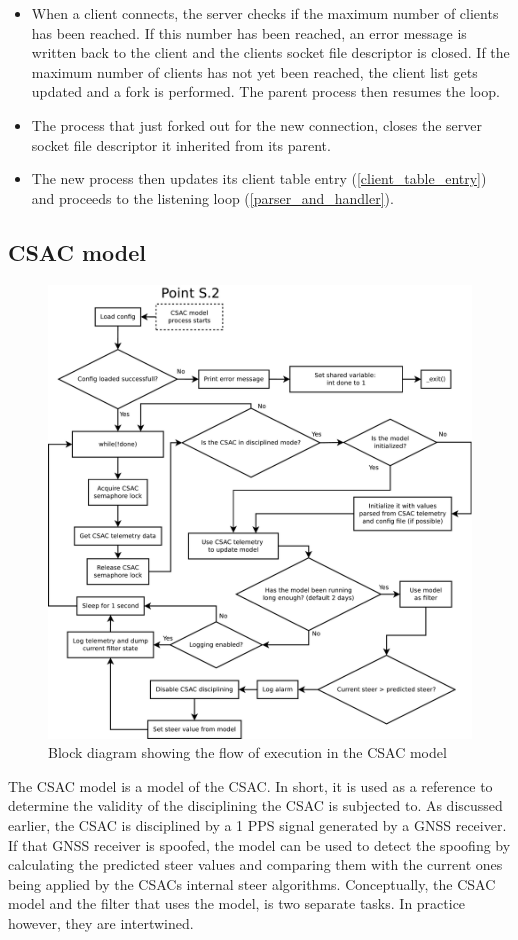 \documentclass[12pt,english,a4paper]{report}
\begin{document}
\begin{itemize}
  \item When a client connects, the server checks if the maximum number of clients has been reached. If this number has been reached, an error message is written back to the client and the clients socket file descriptor is closed. If the maximum number of clients has not yet been reached, the client list gets updated and a fork is performed.
  The parent process then resumes the loop. 
  \item The process that just forked out for the new connection, closes the server socket file descriptor it inherited from its parent. 
  \item The new process then updates its client table entry (\ref{client_table_entry}) and proceeds to the listening loop (\ref{parser_and_handler}).
\end{itemize}

\subsection{CSAC model}
\begin{figure}
\centering
  \includegraphics[scale=0.30]{csac_filter_model.pdf}
   \caption[CSAC model execution flow block diagram]{Block diagram showing the flow of execution in the CSAC model}
   \label{csac_filter}
\end{figure}
The CSAC model is a model of the CSAC. In short, it is used as a reference to determine the validity of the disciplining the CSAC is subjected to. As discussed earlier, the CSAC is disciplined by a 1 PPS signal generated by a GNSS receiver. If that GNSS receiver is spoofed, the model can be used to detect the spoofing by calculating the predicted steer values and comparing them with the current ones being applied by the CSACs internal steer algorithms. Conceptually, the CSAC model and the filter that uses the model, is two separate tasks. In practice however, they are intertwined. 
\end{document}
